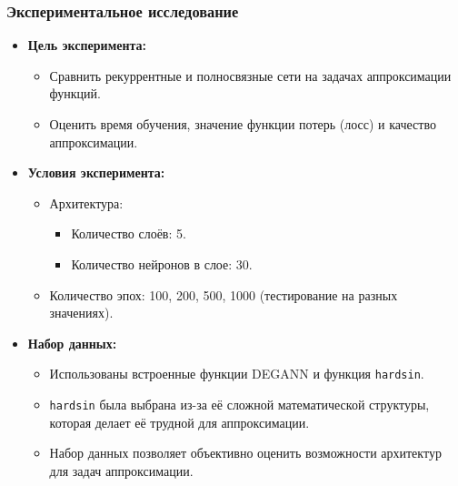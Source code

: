 \documentclass
  [ russian
  , aspectratio=1610 %
  ] {beamer}
\begin{document}
\begin{frame}
    \frametitle{Экспериментальное исследование}
    \begin{itemize}
        \item \textbf{Цель эксперимента:}
        \begin{itemize}
            \item Сравнить рекуррентные и полносвязные сети на задачах аппроксимации функций.
            \item Оценить время обучения, значение функции потерь (лосс) и качество аппроксимации.
        \end{itemize}

        \item \textbf{Условия эксперимента:}
        \begin{itemize}
            \item Архитектура:
            \begin{itemize}
                \item Количество слоёв: 5.
                \item Количество нейронов в слое: 30.
            \end{itemize}
            \item Количество эпох: 100, 200, 500, 1000 (тестирование на разных значениях).
        \end{itemize}

        \item \textbf{Набор данных:}
        \begin{itemize}
            \item Использованы встроенные функции DEGANN и функция \texttt{hardsin}.
            \item \texttt{hardsin} была выбрана из-за её сложной математической структуры, которая делает её трудной для аппроксимации.
            \item Набор данных позволяет объективно оценить возможности архитектур для задач аппроксимации.
        \end{itemize}

    \end{itemize}
\end{frame}
\end{document}
